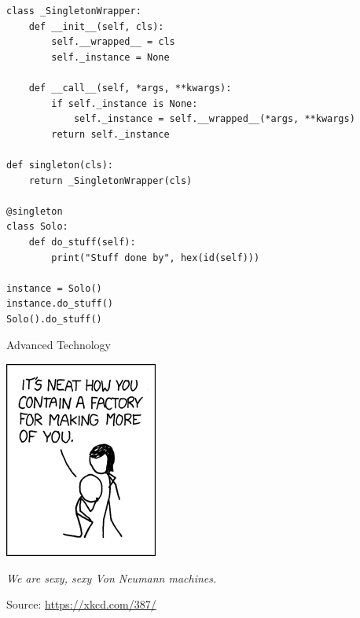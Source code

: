 
\begin{frame}[fragile]
%
\begin{codebox}
\begin{verbatim}
class _SingletonWrapper:
    def __init__(self, cls):
        self.__wrapped__ = cls
        self._instance = None

    def __call__(self, *args, **kwargs):
        if self._instance is None:
            self._instance = self.__wrapped__(*args, **kwargs)
        return self._instance

def singleton(cls):
    return _SingletonWrapper(cls)
 
@singleton   
class Solo:
    def do_stuff(self):
	    print("Stuff done by", hex(id(self)))

instance = Solo()
instance.do_stuff()
Solo().do_stuff()
\end{verbatim}
\end{codebox}
%
\end{frame}


\begin{frame}{Advanced Technology}
%
\begin{center}
	\includegraphics[width=.25\linewidth]{./gfx/13-xkcd-advanced-technology}
\end{center}
%
\begin{center}
	\emph{We are sexy, sexy Von Neumann machines.}

	\vspace{6pt}
	Source: \url{https://xkcd.com/387/}
\end{center}
%
\end{frame}


